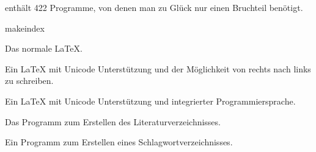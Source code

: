 
\TeXLive{} enthält 422 Programme, von denen man zu Glück nur einen Bruchteil benötigt.

\begin{labeling}{makeindex}
\item[\Program{pdflatex}] Das normale \LaTeX{}.
\item[\Program{xelatex}] Ein \LaTeX{} mit Unicode Unterstützung und der Möglichkeit von rechts nach links zu schreiben.
\item[\Program{lualatex}] Ein \LaTeX{} mit Unicode Unterstützung und integrierter Programmiersprache.
\item[\Program{biber}] Das Programm zum Erstellen des Literaturverzeichnisses.
\item[\Program{makeindex}] Ein Programm zum Erstellen eines Schlagwortverzeichnisses.
\end{labeling}


